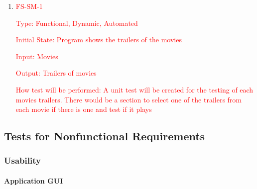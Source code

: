 \documentclass[12pt, titlepage]{article}
\begin{document}
\begin{enumerate}
	
	\item{\textcolor{red}{FS-SM-1\\}}
	
	\textcolor{red}{Type: Functional, Dynamic, Automated}
	
	\textcolor{red}{Initial State: Program shows the trailers of the movies}
	
	\textcolor{red} {Input: Movies}
	
	\textcolor{red}{Output: Trailers of movies}
	
	\textcolor{red}{How test will be performed: A unit test will be created for the testing of each movies trailers. There would be a section to select one of the trailers from each movie if there is one and test if it plays}\\
	
	
\end{enumerate}


\subsection{Tests for Nonfunctional Requirements}

\subsubsection{Usability}
		
\paragraph{Application GUI}
\end{document}
